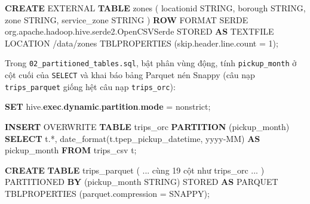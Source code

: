 \documentclass[
  12pt,
  a4paper,
]{article}
\newenvironment{Shaded}{}{}
\newcommand{\DataTypeTok}[1]{\textcolor[rgb]{0.56,0.13,0.00}{#1}}
\newcommand{\DecValTok}[1]{\textcolor[rgb]{0.25,0.63,0.44}{#1}}
\newcommand{\KeywordTok}[1]{\textcolor[rgb]{0.00,0.44,0.13}{\textbf{#1}}}
\newcommand{\NormalTok}[1]{#1}
\newcommand{\OperatorTok}[1]{\textcolor[rgb]{0.40,0.40,0.40}{#1}}
\newcommand{\StringTok}[1]{\textcolor[rgb]{0.25,0.44,0.63}{#1}}
\begin{document}
\begin{Shaded}
\begin{Highlighting}[]
\KeywordTok{CREATE}\NormalTok{ EXTERNAL }\KeywordTok{TABLE}\NormalTok{ zones (}
\NormalTok{  locationid STRING, borough STRING, }\DataTypeTok{zone}\NormalTok{ STRING, service\_zone STRING}
\NormalTok{)}
\KeywordTok{ROW}\NormalTok{ FORMAT SERDE }\StringTok{\textquotesingle{}org.apache.hadoop.hive.serde2.OpenCSVSerde\textquotesingle{}}
\NormalTok{STORED }\KeywordTok{AS}\NormalTok{ TEXTFILE}
\NormalTok{LOCATION }\StringTok{\textquotesingle{}/data/zones\textquotesingle{}}
\NormalTok{TBLPROPERTIES (}\StringTok{\textquotesingle{}skip.header.line.count\textquotesingle{}} \OperatorTok{=} \StringTok{\textquotesingle{}1\textquotesingle{}}\NormalTok{);}
\end{Highlighting}
\end{Shaded}

Trong
\texttt{02\_}\allowbreak{}\texttt{partitioned\_}\allowbreak{}\texttt{tables.}\allowbreak{}\texttt{sql}\allowbreak{},
bật phân vùng động, tính \texttt{pickup\_month} ở cột cuối của
\texttt{SELECT} và khai báo bảng Parquet nén Snappy (câu nạp
\texttt{trips\_parquet} giống hệt câu nạp \texttt{trips\_orc}):

\begin{Shaded}
\begin{Highlighting}[]
\KeywordTok{SET}\NormalTok{ hive.}\KeywordTok{exec}\NormalTok{.}\KeywordTok{dynamic}\NormalTok{.}\KeywordTok{partition}\NormalTok{.}\KeywordTok{mode} \OperatorTok{=}\NormalTok{ nonstrict;}

\KeywordTok{INSERT}\NormalTok{ OVERWRITE }\KeywordTok{TABLE}\NormalTok{ trips\_orc }\KeywordTok{PARTITION}\NormalTok{ (pickup\_month)}
\KeywordTok{SELECT}\NormalTok{ t.}\OperatorTok{*}\NormalTok{,}
\NormalTok{       date\_format(t.tpep\_pickup\_datetime, }\StringTok{\textquotesingle{}yyyy{-}MM\textquotesingle{}}\NormalTok{) }\KeywordTok{AS}\NormalTok{ pickup\_month}
\KeywordTok{FROM}\NormalTok{ trips\_csv t;}

\KeywordTok{CREATE} \KeywordTok{TABLE}\NormalTok{ trips\_parquet ( }\OperatorTok{..}\NormalTok{. cùng }\DecValTok{19}\NormalTok{ cột như trips\_orc }\OperatorTok{..}\NormalTok{. )}
\NormalTok{PARTITIONED }\KeywordTok{BY}\NormalTok{ (pickup\_month STRING)}
\NormalTok{STORED }\KeywordTok{AS}\NormalTok{ PARQUET}
\NormalTok{TBLPROPERTIES (}\StringTok{\textquotesingle{}parquet.compression\textquotesingle{}} \OperatorTok{=} \StringTok{\textquotesingle{}SNAPPY\textquotesingle{}}\NormalTok{);}
\end{Highlighting}
\end{Shaded}
\end{document}
